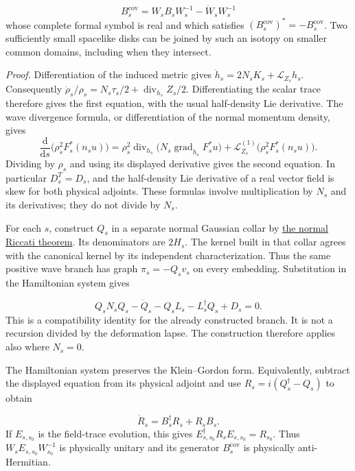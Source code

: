 \documentclass[
  english,
  11pt,
  reqno]{amsart}
\begin{document}
\label{eq:online-wave-spacelike-normalized-generator} \[
B_s^{\mathrm{cov}}
=W_sB_sW_s^{-1}-\dot W_sW_s^{-1}
\] whose complete formal symbol is real and which satisfies
\((B_s^{\mathrm{cov}})^*=-B_s^{\mathrm{cov}}\). Two sufficiently small
spacelike disks can be joined by such an isotopy on smaller common
domains, including when they intersect.

\emph{Proof.} Differentiation of the induced metric gives
\(\dot h_s=2N_sK_s+\mathcal L_{Z_s}h_s\). Consequently
\(\dot\rho_s/\rho_s=N_s\tau_s/2+\operatorname{div}_{h_s}Z_s/2\).
Differentiating the scalar trace therefore gives the first equation,
with the usual half-density Lie derivative. The wave divergence formula,
or differentiation of the normal momentum density, gives \[
\frac{\mathrm d}{\mathrm ds}
  \bigl(\rho_s^2F_s^*(n_su)\bigr)
=\rho_s^2\operatorname{div}_{h_s}
       \bigl(N_s\operatorname{grad}_{h_s}F_s^*u\bigr)
  +\mathcal L_{Z_s}^{(1)}
       \bigl(\rho_s^2F_s^*(n_su)\bigr).
\] Dividing by \(\rho_s\) and using its displayed derivative gives the
second equation. In particular \(D_s^T=D_s\), and the half-density Lie
derivative of a real vector field is skew for both physical adjoints.
These formulas involve multiplication by \(N_s\) and its derivatives;
they do not divide by \(N_s\).

For each \(s\), construct \(Q_s\) in a separate normal Gaussian collar
by \hyperref[thm:online-wave-normal-riccati]{the normal Riccati
theorem}. Its denominators are \(2H_s\). The kernel built in that collar
agrees with the canonical kernel by its independent characterization.
Thus the same positive wave branch has graph \(\pi_s=-Q_sv_s\) on every
embedding. Substitution in the Hamiltonian system gives

\label{eq:online-wave-spacelike-riccati} \[
Q_sN_sQ_s-\dot Q_s-Q_sL_s-L_s^\dagger Q_s+D_s=0.
\] This is a compatibility identity for the already constructed branch.
It is not a recursion divided by the deformation lapse. The construction
therefore applies also where \(N_s=0\).

The Hamiltonian system preserves the Klein--Gordon form. Equivalently,
subtract the displayed equation from its physical adjoint and use
\(R_s=i(Q_s^\dagger-Q_s)\) to obtain

\label{eq:online-wave-spacelike-charge-identity} \[
\dot R_s=B_s^\dagger R_s+R_sB_s.
\] If \(E_{s,s_0}\) is the field-trace evolution, this gives
\(E_{s,s_0}^\dagger R_sE_{s,s_0}=R_{s_0}\). Thus
\(W_sE_{s,s_0}W_{s_0}^{-1}\) is physically unitary and its generator
\(B_s^{\mathrm{cov}}\) is physically anti-Hermitian.
\end{document}
